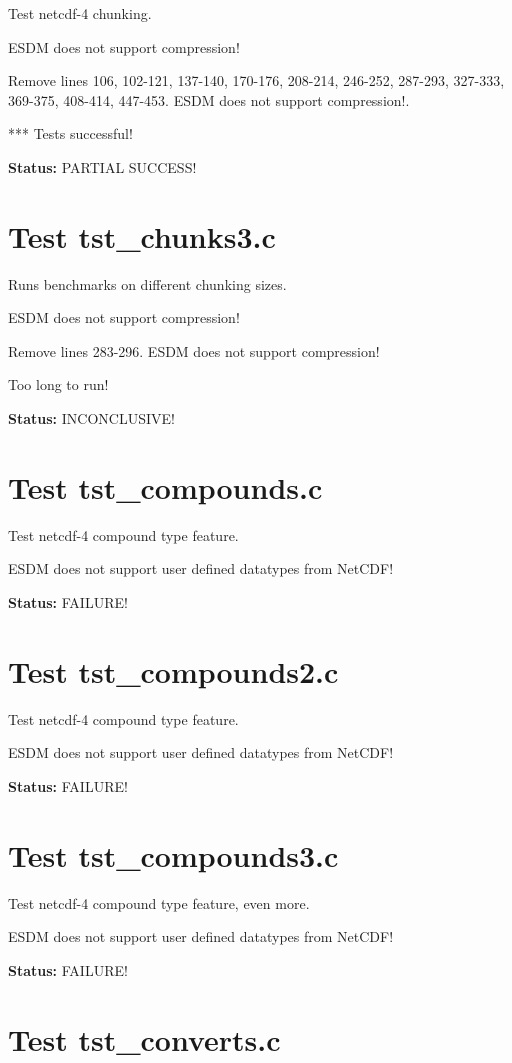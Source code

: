 Test netcdf-4 chunking.

ESDM does not support compression!

Remove lines 106, 102-121, 137-140, 170-176, 208-214, 246-252, 287-293, 327-333, 369-375, 408-414, 447-453. ESDM does not support compression!.

*** Tests successful!

{\bf \large Status: } PARTIAL SUCCESS!

\section{Test tst\_chunks3.c}

Runs benchmarks on different chunking sizes.

ESDM does not support compression!

Remove lines 283-296. ESDM does not support compression!

Too long to run!

{\bf \large Status: } INCONCLUSIVE!

\section{Test tst\_compounds.c}

Test netcdf-4 compound type feature.

ESDM does not support user defined datatypes from NetCDF!

{\bf \large Status: } FAILURE!

\section{Test tst\_compounds2.c}

Test netcdf-4 compound type feature.

ESDM does not support user defined datatypes from NetCDF!

{\bf \large Status: } FAILURE!

\section{Test tst\_compounds3.c}

Test netcdf-4 compound type feature, even more.

ESDM does not support user defined datatypes from NetCDF!

{\bf \large Status: } FAILURE!

\section{Test tst\_converts.c}


